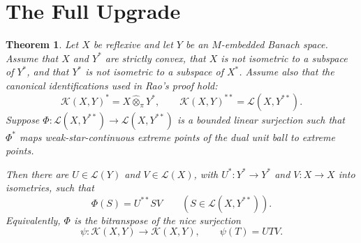 \documentclass[11pt]{article}
\newtheorem{theorem}{Theorem}
\newcommand{\K}{\mathcal K}
\newcommand{\Lcal}{\mathcal L}
\newcommand{\what}{\widehat{\otimes}}
\begin{document}
\section*{The Full Upgrade}

\begin{theorem}
Let \(X\) be reflexive and let \(Y\) be an \(M\)-embedded Banach space. Assume that \(X\) and \(Y^*\) are strictly convex, that \(X\) is not isometric to a subspace of \(Y^*\), and that \(Y^*\) is not isometric to a subspace of \(X^*\). Assume also that the canonical identifications used in Rao's proof hold:
\[
\K(X,Y)^*=X\what_{\pi}Y^*,\qquad
\K(X,Y)^{**}=\Lcal(X,Y^{**}).
\]
Suppose \(\Phi:\Lcal(X,Y^{**})\to\Lcal(X,Y^{**})\) is a bounded linear surjection such that \(\Phi^*\) maps weak-star-continuous extreme points of the dual unit ball to extreme points.

Then there are \(U\in\Lcal(Y)\) and \(V\in\Lcal(X)\), with \(U^*:Y^*\to Y^*\) and \(V:X\to X\) into isometries, such that
\[
\Phi(S)=U^{**}SV\qquad(S\in \Lcal(X,Y^{**})).
\]
Equivalently, \(\Phi\) is the bitranspose of the nice surjection
\[
\psi:\K(X,Y)\to\K(X,Y),\qquad \psi(T)=UTV.
\]
\end{theorem}
\end{document}
